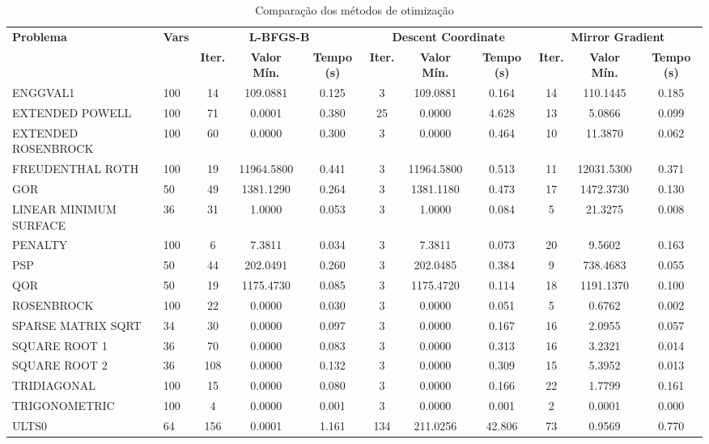 \documentclass[12pt,a4paper]{article}
\begin{document}
\begin{landscape}
\begin{table}[h!]
\centering
\caption{Comparação dos métodos de otimização}
\label{tab:comparacao}
\footnotesize
\begin{tabular}{@{}ll|ccc|ccc|ccc@{}}
\toprule
\multirow{2}{*}{\textbf{Problema}} & \multirow{2}{*}{\textbf{Vars}} & \multicolumn{3}{c|}{\textbf{L-BFGS-B}} & \multicolumn{3}{c|}{\textbf{Descent Coordinate}} & \multicolumn{3}{c}{\textbf{Mirror Gradient}} \\
\cmidrule(lr){3-5} \cmidrule(lr){6-8} \cmidrule(lr){9-11}
& & \textbf{Iter.} & \textbf{Valor Mín.} & \textbf{Tempo (s)} & \textbf{Iter.} & \textbf{Valor Mín.} & \textbf{Tempo (s)} & \textbf{Iter.} & \textbf{Valor Mín.} & \textbf{Tempo (s)} \\
\midrule
ENGGVAL1 & 100 & 14 & 109.0881 & 0.125 & 3 & 109.0881 & 0.164 & 14 & 110.1445 & 0.185 \\
EXTENDED POWELL & 100 & 71 & 0.0001 & 0.380 & 25 & 0.0000 & 4.628 & 13 & 5.0866 & 0.099 \\
EXTENDED ROSENBROCK & 100 & 60 & 0.0000 & 0.300 & 3 & 0.0000 & 0.464 & 10 & 11.3870 & 0.062 \\
FREUDENTHAL ROTH & 100 & 19 & 11964.5800 & 0.441 & 3 & 11964.5800 & 0.513 & 11 & 12031.5300 & 0.371 \\
GOR & 50 & 49 & 1381.1290 & 0.264 & 3 & 1381.1180 & 0.473 & 17 & 1472.3730 & 0.130 \\
LINEAR MINIMUM SURFACE & 36 & 31 & 1.0000 & 0.053 & 3 & 1.0000 & 0.084 & 5 & 21.3275 & 0.008 \\
PENALTY & 100 & 6 & 7.3811 & 0.034 & 3 & 7.3811 & 0.073 & 20 & 9.5602 & 0.163 \\
PSP & 50 & 44 & 202.0491 & 0.260 & 3 & 202.0485 & 0.384 & 9 & 738.4683 & 0.055 \\
QOR & 50 & 19 & 1175.4730 & 0.085 & 3 & 1175.4720 & 0.114 & 18 & 1191.1370 & 0.100 \\
ROSENBROCK & 100 & 22 & 0.0000 & 0.030 & 3 & 0.0000 & 0.051 & 5 & 0.6762 & 0.002 \\
SPARSE MATRIX SQRT & 34 & 30 & 0.0000 & 0.097 & 3 & 0.0000 & 0.167 & 16 & 2.0955 & 0.057 \\
SQUARE ROOT 1 & 36 & 70 & 0.0000 & 0.083 & 3 & 0.0000 & 0.313 & 16 & 3.2321 & 0.014 \\
SQUARE ROOT 2 & 36 & 108 & 0.0000 & 0.132 & 3 & 0.0000 & 0.309 & 15 & 5.3952 & 0.013 \\
TRIDIAGONAL & 100 & 15 & 0.0000 & 0.080 & 3 & 0.0000 & 0.166 & 22 & 1.7799 & 0.161 \\
TRIGONOMETRIC & 100 & 4 & 0.0000 & 0.001 & 3 & 0.0000 & 0.001 & 2 & 0.0001 & 0.000 \\
ULTS0 & 64 & 156 & 0.0001 & 1.161 & 134 & 211.0256 & 42.806 & 73 & 0.9569 & 0.770 \\

\bottomrule
\end{tabular}
\end{table}
\end{landscape}
\end{document}
